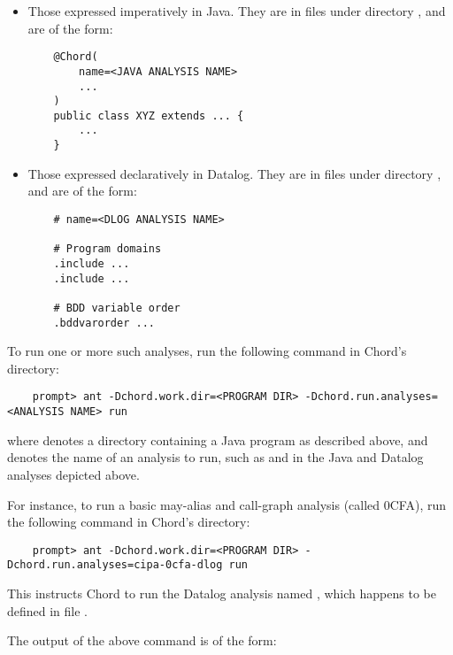 \begin{itemize}
\item
Those expressed imperatively in Java. They are in  files under
directory , and are of the form:

\begin{verbatim}
    @Chord(
        name=<JAVA ANALYSIS NAME>
        ...
    )
    public class XYZ extends ... {
        ...
    }
\end{verbatim}

\item

Those expressed declaratively in Datalog.  They are in  files under
directory , and are of the form:

\begin{verbatim}
    # name=<DLOG ANALYSIS NAME>

    # Program domains
    .include ...
    .include ...

    # BDD variable order
    .bddvarorder ...
\end{verbatim}
\end{itemize}

To run one or more such analyses, run the following command in Chord's  directory:

\begin{verbatim}
    prompt> ant -Dchord.work.dir=<PROGRAM DIR> -Dchord.run.analyses=<ANALYSIS NAME> run
\end{verbatim}

where {\tt <PROGRAM DIR>} denotes a directory containing a Java program as described above,
and {\tt <ANALYSIS NAME>} denotes the name of an analysis to run,
such as {\tt <JAVA ANALYSIS NAME>} and {\tt <DLOG ANALYSIS NAME>} in the Java and
Datalog analyses depicted above.

For instance, to run a basic may-alias and call-graph analysis (called 0CFA),
run the following command in Chord's  directory:

\begin{verbatim}
    prompt> ant -Dchord.work.dir=<PROGRAM DIR> -Dchord.run.analyses=cipa-0cfa-dlog run
\end{verbatim}

This instructs Chord to run the Datalog analysis named ,
which happens to be defined in file .

The output of the above command is of the form:

